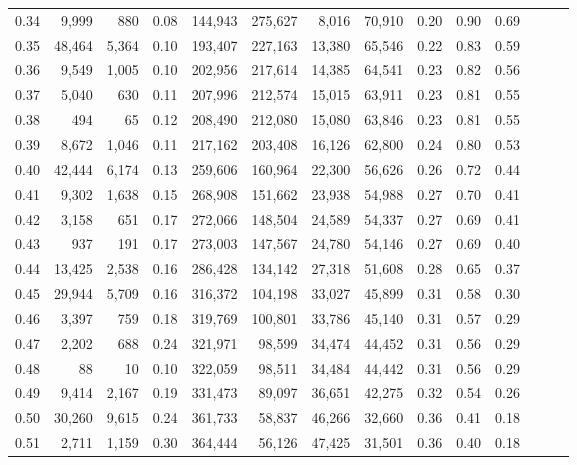 \begin{tabular}{rrrrrrrrrrrrrr}
0.34 &   9,999 &    880 &  0.08 &  144,943 &  275,627 &   8,016 &  70,910 &  0.20 &  0.90 &      0.69 \\
0.35 &  48,464 &  5,364 &  0.10 &  193,407 &  227,163 &  13,380 &  65,546 &  0.22 &  0.83 &      0.59 \\
0.36 &   9,549 &  1,005 &  0.10 &  202,956 &  217,614 &  14,385 &  64,541 &  0.23 &  0.82 &      0.56 \\
0.37 &   5,040 &    630 &  0.11 &  207,996 &  212,574 &  15,015 &  63,911 &  0.23 &  0.81 &      0.55 \\
0.38 &     494 &     65 &  0.12 &  208,490 &  212,080 &  15,080 &  63,846 &  0.23 &  0.81 &      0.55 \\
0.39 &   8,672 &  1,046 &  0.11 &  217,162 &  203,408 &  16,126 &  62,800 &  0.24 &  0.80 &      0.53 \\
0.40 &  42,444 &  6,174 &  0.13 &  259,606 &  160,964 &  22,300 &  56,626 &  0.26 &  0.72 &      0.44 \\
0.41 &   9,302 &  1,638 &  0.15 &  268,908 &  151,662 &  23,938 &  54,988 &  0.27 &  0.70 &      0.41 \\
0.42 &   3,158 &    651 &  0.17 &  272,066 &  148,504 &  24,589 &  54,337 &  0.27 &  0.69 &      0.41 \\
0.43 &     937 &    191 &  0.17 &  273,003 &  147,567 &  24,780 &  54,146 &  0.27 &  0.69 &      0.40 \\
0.44 &  13,425 &  2,538 &  0.16 &  286,428 &  134,142 &  27,318 &  51,608 &  0.28 &  0.65 &      0.37 \\
0.45 &  29,944 &  5,709 &  0.16 &  316,372 &  104,198 &  33,027 &  45,899 &  0.31 &  0.58 &      0.30 \\
0.46 &   3,397 &    759 &  0.18 &  319,769 &  100,801 &  33,786 &  45,140 &  0.31 &  0.57 &      0.29 \\
0.47 &   2,202 &    688 &  0.24 &  321,971 &   98,599 &  34,474 &  44,452 &  0.31 &  0.56 &      0.29 \\
0.48 &      88 &     10 &  0.10 &  322,059 &   98,511 &  34,484 &  44,442 &  0.31 &  0.56 &      0.29 \\
0.49 &   9,414 &  2,167 &  0.19 &  331,473 &   89,097 &  36,651 &  42,275 &  0.32 &  0.54 &      0.26 \\
0.50 &  30,260 &  9,615 &  0.24 &  361,733 &   58,837 &  46,266 &  32,660 &  0.36 &  0.41 &      0.18 \\
0.51 &   2,711 &  1,159 &  0.30 &  364,444 &   56,126 &  47,425 &  31,501 &  0.36 &  0.40 &      0.18 \\

\end{tabular}
